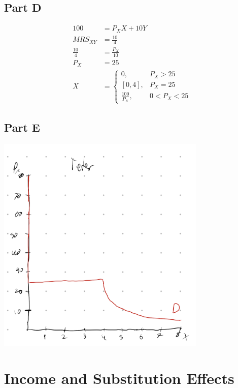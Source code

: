 \documentclass[8pt]{extarticle}
\begin{document}
{\subsection*{Part D}
\begin{align*}
	100 &= P_X X + 10Y \\
	MRS_{XY} &= \frac{10}{4} \\
	\frac{10}{4} &= \frac{P_X}{10} \\
	P_X &= 25 \\
	X &= \begin{cases}
		0, & P_X > 25 \\
		[0,4], & P_X = 25 \\
		\frac{100}{P_X}, & 0 < P_X < 25
	\end{cases}
\end{align*}
\subsection*{Part E}
\begin{center}
	\includegraphics[width=10cm]{HW4Q7E}
\end{center}
\section*{Income and Substitution Effects}
}
\end{document}
